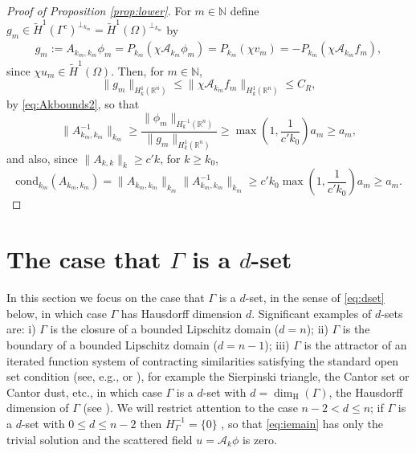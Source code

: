 \documentclass{birkjour}
\theoremstyle{definition}
\theoremstyle{remark}
\numberwithin{equation}{section}
\newcommand{\dimH}{\dim_{\mathrm{H}}}
\newcommand{\R}{\mathbb{R}}
\newcommand{\N}{\mathbb{N}}
\newcommand{\cA}{\mathcal{A}}
\newcommand{\cond}{\mathrm{cond}}
\begin{document}
\begin{proof}[Proof of Proposition \ref{prop:lower}]
For $m\in \N$ define $g_m \in \widetilde H^1(\Gamma^c)^{\perp_{k_m}}= \widetilde H^1(\Omega)^{\perp_{k_m}}$ by
\begin{align*} 
g_m := A_{k_m,k_m}\phi_m =P_{k_m}(\chi\cA_{k_m}\phi_m) = P_{k_m}(\chi v_m) = -P_{k_m}(\chi \cA_{k_m}f_m),
\end{align*}
since $\chi u_m\in \widetilde H^1(\Omega)$. Then, for $m\in \N$,
$$
\|g_m\|_{H^1_k(\R^n)} \leq \|\chi \cA_{k_m}f_m\|_{H^1_k(\R^n)} \leq C_R,
$$
by \eqref{eq:Akbounds2}, so that
$$
\|A_{k_m,k_m}^{-1}\|_{k_m} \geq \frac{\|\phi_m\|_{H^{-1}_k(\R^n)}}{\|g_m\|_{H^1_k(\R^n)}} \geq \max\left(1,\frac{1}{c'k_0}\right)a_m\geq a_m,
$$
and also, since $\|A_{k,k}\|_k\geq c'k$, for $k\geq k_0$, 
$$
\cond_{k_m}(A_{k_m,k_m}) = \|A_{k_m,k_m}\|_{k_m} \|A_{k_m,k_m}^{-1}\|_{k_m} \geq c'k_0 \max\left(1,\frac{1}{c'k_0}\right)a_m\geq a_m.
$$
\end{proof}

\section{The case that $\Gamma$ is a $d$-set} \label{sec:dset}
In this section we focus on the case that $\Gamma$ is a $d$-set, in the sense of \eqref{eq:dset} below, %
in which case $\Gamma$ has Hausdorff dimension $d$. Significant examples of $d$-sets are: i) $\Gamma$ is the closure of a bounded Lipschitz domain ($d=n$); ii) $\Gamma$ is the boundary of a bounded Lipschitz domain ($d=n-1$); iii) $\Gamma$ is the attractor of an iterated function system of contracting similarities satisfying the standard open set condition (see, e.g., \cite[\S9.2]{Falconer2014} or \cite[\S2.1]{caetano2025integral}), for example the Sierpinski triangle, the Cantor set or Cantor dust, etc., in which case $\Gamma$ is a $d$-set with $d=\dimH(\Gamma)$, the Hausdorff dimension of $\Gamma$ (see \cite[Theorem 4.7]{Triebel97FracSpec}). 
We will restrict attention to the case $n-2<d\leq n$; if $\Gamma$ is a $d$-set with $0\leq d\leq n-2$ then $H_\Gamma^{-1}=\{0\}$ \cite[Rem.~3.5]{caetano2025integral}, so that \eqref{eq:iemain} has only the trivial solution and the scattered field $u = \cA_k \phi$ is zero.
\end{document}
